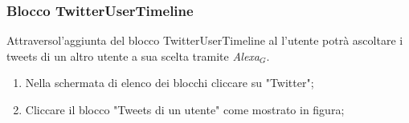 \subsubsection{Blocco TwitterUserTimeline} \label{twitterU}
Attraversol'aggiunta del blocco TwitterUserTimeline al l'utente potrà ascoltare i tweets di un altro utente a sua scelta tramite \textit{Alexa$_{G}$}.
\begin{enumerate}
	\item Nella schermata di elenco dei blocchi cliccare su "Twitter";
	\item Cliccare il blocco "Tweets di un utente" come mostrato in figura;
	\begin{figure}[!ht]
		\centering

\end{figure}
\end{enumerate}
